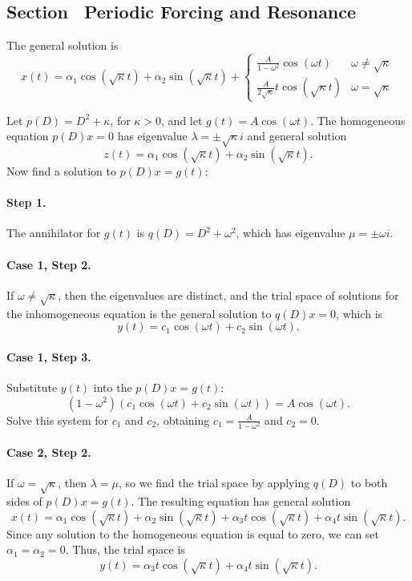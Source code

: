 \subsection*{Section~\protect{\ref{S:resonance}} Periodic Forcing and Resonance}

 \ans The general solution is
\[
x(t) = \alpha_1\cos(\sqrt{\kappa}t) + \alpha_2\sin(\sqrt{\kappa}t)
+ \left\{
\begin{array}{lr} \frac{A}{1 - \omega^2}\cos(\omega t) &
\omega \neq \sqrt{\kappa} \\
\frac{A}{2\sqrt{\kappa}}t\cos(\sqrt{\kappa}t) &
\omega = \sqrt{\kappa}
\end{array}\right.
\]

\soln Let $p(D) = D^2 + \kappa$, for $\kappa > 0$, and let $g(t) =
A\cos(\omega t)$.  The homogeneous equation $p(D)x = 0$ has eigenvalue
$\lambda = \pm \sqrt{\kappa} i$ and general solution
\[
z(t) = \alpha_1\cos(\sqrt{\kappa}t) + \alpha_2\sin(\sqrt{\kappa}t).
\]
Now find a solution to $p(D)x = g(t)$:

\paragraph{Step 1.} The annihilator for $g(t)$ is $q(D) =
D^2 + \omega^2$, which has eigenvalue $\mu = \pm \omega i$.

\paragraph{Case 1, Step 2.} If $\omega \neq \sqrt{\kappa}$, then the
eigenvalues are distinct, and the trial space of solutions for the
inhomogeneous equation is the general solution to $q(D)x = 0$, which
is
\[
y(t) = c_1\cos(\omega t) + c_2\sin(\omega t).
\]
\paragraph{Case 1, Step 3.} Substitute $y(t)$ into the $p(D)x = g(t)$:
\[
(1 - \omega^2)(c_1\cos(\omega t) + c_2\sin(\omega t)) = A\cos(\omega t).
\]
Solve this system for $c_1$ and $c_2$, obtaining $c_1 = \frac{A}
{1 - \omega^2}$ and $c_2 = 0$.

\paragraph{Case 2, Step 2.} If $\omega = \sqrt{\kappa}$, then $\lambda =
\mu$, so we find the trial space by applying $q(D)$ to both sides of
$p(D)x = g(t)$.  The resulting equation has general solution
\[
x(t) = \alpha_1\cos(\sqrt{\kappa}t) + \alpha_2\sin(\sqrt{\kappa}t)
+ \alpha_3t\cos(\sqrt{\kappa}t) + \alpha_4t\sin(\sqrt{\kappa}t).
\]
Since any solution to the homogeneous equation is equal to zero, we can
set $\alpha_1 = \alpha_2 = 0$.  Thus, the trial space is
\[
y(t) = \alpha_3t\cos(\sqrt{\kappa}t) + \alpha_4t\sin(\sqrt{\kappa}t).
\]
